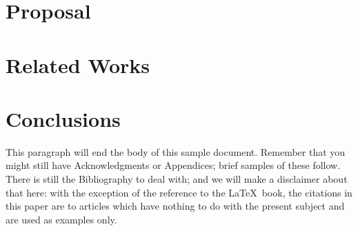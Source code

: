 


\section{Proposal}
\section{Related Works}

\section{Conclusions}
This paragraph will end the body of this sample document.
Remember that you might still have Acknowledgments or
Appendices; brief samples of these
follow.  There is still the Bibliography to deal with; and
we will make a disclaimer about that here: with the exception
of the reference to the \LaTeX\ book, the citations in
this paper are to articles which have nothing to
do with the present subject and are used as
examples only.



